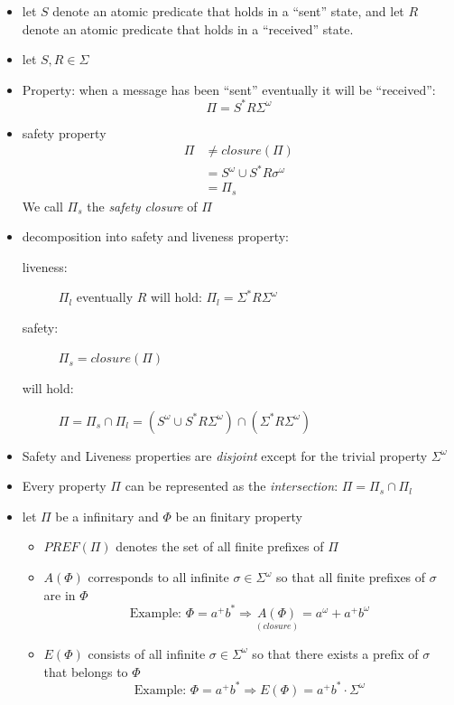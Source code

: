 \documentclass[a4paper, 10pt]{article}
\begin{document}
\begin{itemize}
    \item let $S$ denote an atomic predicate that holds in a ``sent'' state, and let $R$ denote an atomic predicate that holds in a ``received'' state.
    \item let $S,R\in \Sigma$
    \item Property: when a message has been ``sent'' eventually it will be ``received'': \[ \Pi=S^*R\Sigma^\omega \]
    \item safety property
    \begin{align*}
    \Pi & \not= closure(\Pi) \\
    &= S^\omega\cup S^*R\sigma^\omega \\
    &= \Pi_s
    \end{align*}
    We call $\Pi_s$ the \emph{safety closure} of $\Pi$
    \item decomposition into safety and liveness property:
    \begin{description}
        \item[liveness:] $\Pi_l$ eventually $R$ will hold: $\Pi_l=\Sigma^* R\Sigma^\omega$
        \item[safety:] $\Pi_s = closure(\Pi)$
        \item[will hold:] $\Pi=\Pi_s\cap\Pi_l=(S^\omega\cup S^*R\Sigma^\omega)\cap(\Sigma^* R \Sigma^\omega)$
    \end{description}
    \item Safety and Liveness properties are \emph{disjoint} except for the trivial property $\Sigma^\omega$
    \item Every property $\Pi$ can be represented as the \emph{intersection}: $\Pi=\Pi_s\cap\Pi_l$
    \item let $\Pi$ be a infinitary and $\Phi$ be an finitary property
    \begin{itemize}
        \item $PREF(\Pi)$ denotes the set of all finite prefixes of $\Pi$
        \item $A(\Phi)$ corresponds to all infinite $\sigma\in\Sigma^\omega$ so that all finite prefixes of $\sigma$ are in $\Phi$ \[ \textrm{Example: } \Phi=a^+b^*\Rightarrow \underset{(closure)}{A(\Phi)}=a^\omega+a^+b^\omega \]
        \item $E(\Phi)$ consists of all infinite $\sigma\in\Sigma^\omega$ so that there exists a prefix of $\sigma$ that belongs to $\Phi$ \[ \textrm{Example: } \Phi=a^+b^*\Rightarrow E(\Phi)=a^+b^*\cdot \Sigma^\omega \] \\

\end{itemize}
\end{itemize}
\end{document}
